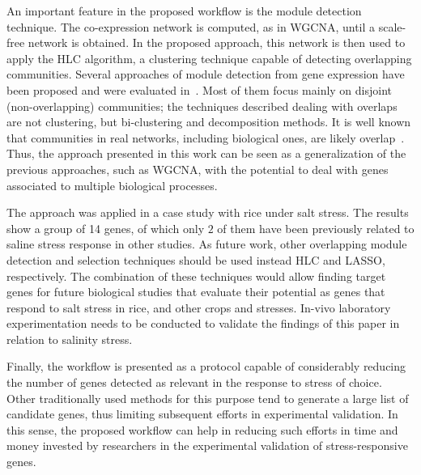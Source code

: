 \documentclass{bmcart}
\begin{document}
An important feature in the proposed workflow is the module
detection technique. The co-expression network is computed, as in
WGCNA, until a scale-free network is obtained. In the proposed
approach, this network is then used to apply the HLC algorithm, a
clustering technique capable of detecting overlapping
communities. Several approaches of module detection from gene
expression have been proposed and were evaluated
in~\cite{saelens2018comprehensive}. Most of them focus mainly on
disjoint (non-overlapping) communities; the techniques described
dealing with overlaps are not clustering, but bi-clustering and
decomposition methods. It is well known that communities in real
networks, including biological ones, are likely
overlap~\cite{palla2005uncovering}. Thus, the approach presented
in this work can be seen as a generalization of the previous
approaches, such as WGCNA, with the potential to deal with genes
associated to multiple biological processes.
\vspace{0.5cm}

The approach was applied in a case study with rice under salt
stress. The results show a group of 14 genes, of which only $2$ of
them have been previously related to saline stress response in other
studies. As future work, other overlapping module detection and
selection techniques should be used instead HLC and LASSO,
respectively. The combination of these techniques would allow finding
target genes for future biological studies that evaluate their
potential as genes that respond to salt stress in rice, and other
crops and stresses. In-vivo laboratory experimentation needs to be
conducted to validate the findings of this paper in relation to
salinity stress.
\vspace{0.5cm}

Finally, the workflow is presented as a protocol capable of
considerably reducing the number of genes detected as relevant in the
response to stress of choice. Other traditionally used methods for
this purpose tend to generate a large list of candidate genes, thus
limiting subsequent efforts in experimental validation. In this sense,
the proposed workflow can help in reducing such efforts in time and
money invested by researchers in the experimental validation of
stress-responsive genes.


\end{document}

